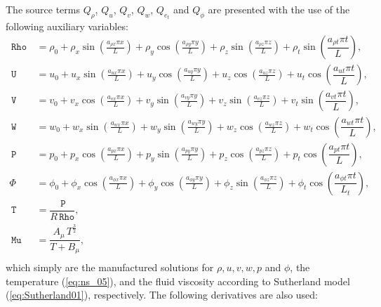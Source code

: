 \documentclass[10pt]{article}
\newcommand{\Rho}{\,\mathtt{Rho}}
\newcommand{\PP}{\,\mathtt{P}}
\newcommand{\U}{\,\mathtt{U}}
\newcommand{\V}{\,\mathtt{V}}
\newcommand{\W}{\,\mathtt{W}}
\newcommand{\Mu}{\,\mathtt{Mu}}
\newcommand{\T}{\,\mathtt{T}\,}
\begin{document}
The source terms $Q_\rho$, $Q_u$, $Q_v$, $Q_w$, $Q_{e_t}$ and $Q_\phi$ are  presented with the use of the following auxiliary variables:
\begin{equation}
 \begin{split}
\label{eq:aux_01}
\Rho \, &= \rho_{0}+ \rho_{x} \sin\left(\frac{a_{ \rho  x} \pi x}{L}\right)+ \rho_{y} \cos\left(\frac{a_{ \rho  y} \pi y}{L}\right) + \rho_{z} \sin\left(\frac{a_{ \rho  z} \pi z}{L}\right)+ \rho_t \sin\left(\dfrac{a_{\rho t} \pi t}{L}\right),\\
\U&=u_{0}+u_{x} \sin\left(\frac{a_{u  x} \pi x}{L}\right)+u_{y} \cos\left(\frac{a_{u  y} \pi y}{L}\right)+u_{z} \cos\left(\frac{a_{u  z} \pi z}{L}\right) + u_t \cos\left(\dfrac{a_{u t} \pi t}{L}\right) ,\\
\V \, &= v_{0}+v_{x} \cos\left(\frac{a_{v  x} \pi x}{L}\right)+v_{y} \sin\left(\frac{a_{v  y} \pi y}{L}\right)+v_{z} \sin\left(\frac{a_{v  z} \pi z}{L}\right)+ v_t \sin\left(\dfrac{a_{v t} \pi t}{L}\right), \\
\W \, &= w_{0}+w_{x} \sin\left(\frac{a_{w  x} \pi x}{L}\right)+w_{y} \sin\left(\frac{a_{w  y} \pi y}{L}\right)+ w_{z} \cos\left(\frac{a_{w  z} \pi z}{L}\right) + w_t \cos\left(\dfrac{a_{w t} \pi t}{L}\right),\\
\PP \, &= p_{0}+p_{x} \cos\left(\frac{a_{p  x} \pi x}{L}\right)+p_{y} \sin\left(\frac{a_{p  y} \pi y}{L}\right)+ p_{z} \cos\left(\frac{a_{p  z} \pi z}{L}\right)+ p_t \cos\left(\dfrac{a_{p t} \pi t}{L}\right),\\
\Phi \,  &= \phi_{0}+\phi_{x} \cos\left(\frac{a_{\phi  x} \pi x}{L}\right)+\phi_{y} \cos\left(\frac{a_{\phi  y} \pi y}{L}\right)+ \phi_{z} \sin\left(\frac{a_{\phi  z} \pi z}{L}\right)+ \phi_t \cos\left(\dfrac{a_{\phi t} \pi t}{L_t}\right),\\
\T&= \dfrac{\PP}{R\Rho},\\
\Mu  &=\dfrac{A_\mu \, T^{\frac{3}{2}}}{T+B_\mu},\\
\end{split}
\end{equation}
which simply are the manufactured solutions for $\rho, u, v, w, p$ and $\phi$, the temperature (\ref{eq:ns_05}), and  the fluid viscosity according to Sutherland model (\ref{eq:Sutherland01}), respectively. The following derivatives are also used:
% 
\end{document}
